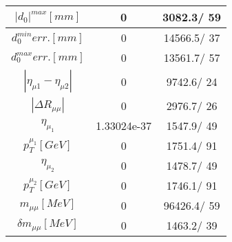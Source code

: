 \documentclass{article}
\begin{document}
\begin{table}[htbp]
\begin{center}
\begin{tabular}{c|c|c}
\hline
$|d_{0}|^{max} [mm]$ & 0 & 3082.3/ 59\\
\hline
$d_{0}^{min} err. [mm]$ & 0 & 14566.5/ 37\\
\hline
$d_{0}^{max} err. [mm]$ & 0 & 13561.7/ 57\\
\hline
$|\eta_{\mu1}-\eta_{\mu2}|$ & 0 & 9742.6/ 24\\
\hline
$|\Delta R_{\mu \mu}|$ & 0 & 2976.7/ 26\\
\hline
$\eta_{\mu_{1}}$ & 1.33024e-37 & 1547.9/ 49\\
\hline
$p_{T}^{\mu_{1}} [GeV]$ & 0 & 1751.4/ 91\\
\hline
$\eta_{\mu_{2}}$ & 0 & 1478.7/ 49\\
\hline
$p_{T}^{\mu_{2}} [GeV]$ & 0 & 1746.1/ 91\\
\hline
$m_{\mu\mu} [MeV]$ & 0 & 96426.4/ 59\\
\hline
$\delta m_{\mu\mu} [MeV]$ & 0 & 1463.2/ 39\\
\hline
\end{tabular}
\end{center}
\end{table}
\end{document}
